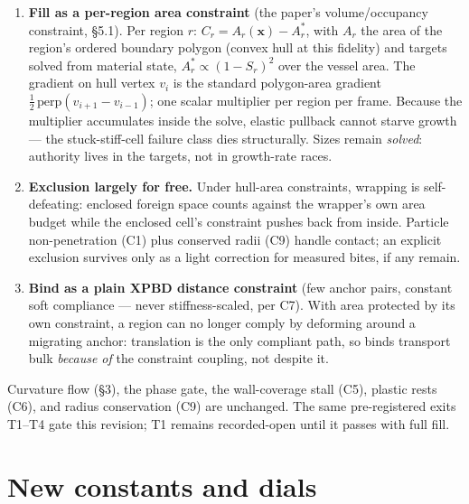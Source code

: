 \documentclass[11pt]{article}
\begin{document}
\begin{enumerate}[leftmargin=1.6em]
\item \textbf{Fill as a per-region area constraint} (the paper's
volume/occupancy constraint, \S5.1). Per region $r$:
$C_r = A_r(\mathbf{x}) - A_r^{*}$, with $A_r$ the area of the region's
ordered boundary polygon (convex hull at this fidelity) and targets solved
from material state, $A_r^{*} \propto (1-S_r)^2$ over the vessel area.
The gradient on hull vertex $v_i$ is the standard polygon-area gradient
$\tfrac{1}{2}\,\mathrm{perp}(v_{i+1}-v_{i-1})$; one scalar multiplier per
region per frame. Because the multiplier accumulates inside the solve,
elastic pullback cannot starve growth --- the stuck-stiff-cell failure
class dies structurally. Sizes remain \emph{solved}: authority lives in
the targets, not in growth-rate races.
\item \textbf{Exclusion largely for free.} Under hull-area constraints,
wrapping is self-defeating: enclosed foreign space counts against the
wrapper's own area budget while the enclosed cell's constraint pushes back
from inside. Particle non-penetration (C1) plus conserved radii (C9)
handle contact; an explicit exclusion survives only as a light correction
for measured bites, if any remain.
\item \textbf{Bind as a plain XPBD distance constraint} (few anchor pairs,
constant soft compliance --- never stiffness-scaled, per C7). With area
protected by its own constraint, a region can no longer comply by
deforming around a migrating anchor: translation is the only compliant
path, so binds transport bulk \emph{because of} the constraint coupling,
not despite it.
\end{enumerate}

Curvature flow (\S3), the phase gate, the wall-coverage stall (C5), plastic
rests (C6), and radius conservation (C9) are unchanged. The same
pre-registered exits T1--T4 gate this revision; T1 remains recorded-open
until it passes with full fill.

\section{New constants and dials}
\end{document}
